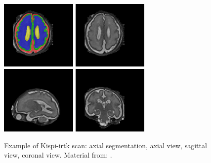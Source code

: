 \begin{figure}[htbp]
    \centering
    \includegraphics[width=0.33\textwidth]{figures/irtk_ax_dseg.png}
    \hspace{5pt}
    \includegraphics[width=0.33\textwidth]{figures/irtk_ax.png} \\
    \vspace{10pt}
    \includegraphics[width=0.33\textwidth]{figures/irtk_sag.png}
    \hspace{5pt}
    \includegraphics[width=0.33\textwidth]{figures/irtk_cor.png}
    \caption{Example of Kispi-irtk scan: axial segmentation, axial view, sagittal view, coronal view. Material from: \cite{Payette2021, FeTA_MICCAI}.}
    \label{fig:kispi-irtk_images}
\end{figure}

